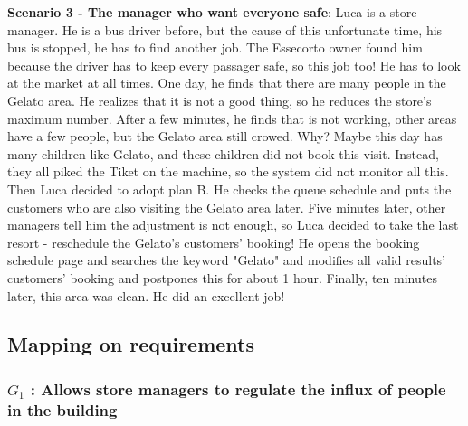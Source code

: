 \documentclass[a4paper,12pt]{report}
\begin{document}
\textbf{Scenario 3 - The manager who want everyone safe}: Luca is a store manager. He is a bus driver before, but the cause of this unfortunate time, his bus is stopped, he has to find another job. The Essecorto owner found him because the driver has to keep every passager safe, so this job too! He has to look at the market at all times. One day, he finds that there are many people in the Gelato area. He realizes that it is not a good thing, so he reduces the store's maximum number. After a few minutes,  he finds that is not working, other areas have a few people, but the Gelato area still crowed. Why? Maybe this day has many children like Gelato, and these children did not book this visit. Instead, they all piked the Tiket on the machine, so the system did not monitor all this. Then Luca decided to adopt plan B. He checks the queue schedule and puts the customers who are also visiting the Gelato area later. Five minutes later, other managers tell him the adjustment is not enough, so Luca decided to take the last resort - reschedule the Gelato's customers' booking! He opens the booking schedule page and searches the keyword "Gelato" and modifies all valid results' customers' booking and postpones this for about 1 hour. Finally, ten minutes later, this area was clean. He did an excellent job!


\subsection{Mapping on requirements}
\subsubsection{$G_1$ : Allows store managers to regulate the influx of people in the building}
\end{document}
